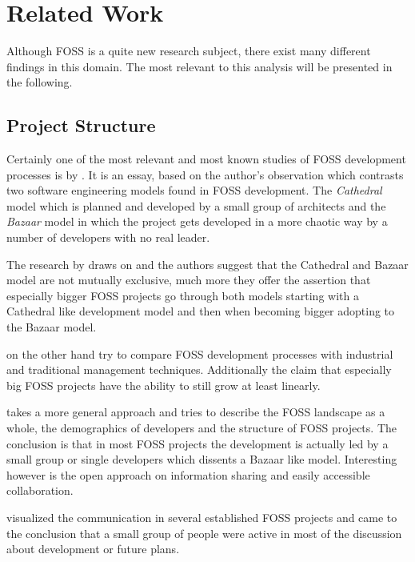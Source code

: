 \chapter{Related Work} %
\label{chap:related work}

Although \ac{FOSS} is a quite new research subject, there exist many different
findings in this domain. The most relevant to this analysis will be presented
in the following.

\section{Project Structure} %

Certainly one of the most relevant and most known studies of \ac{FOSS}
development processes is  by \textcite{Raymond1998}. It
is an essay, based on the author's observation which contrasts two software
engineering models found in \ac{FOSS} development. The \emph{Cathedral} model
which is planned and developed by a small group of architects and the
\emph{Bazaar} model in which the project gets developed in a more chaotic way
by a number of developers with no real leader.

The research by \textcite{Capiluppi2007} draws on  and
the authors suggest that the Cathedral and Bazaar model are not mutually
exclusive, much more they offer the assertion that especially bigger \ac{FOSS}
projects go through both models starting with a Cathedral like development
model and then when becoming bigger adopting to the Bazaar model.

\textcite{Godfrey2000} on the other hand try to compare \ac{FOSS} development
processes with industrial and traditional management techniques. Additionally
the claim that especially big \ac{FOSS} projects have the ability to still grow
at least linearly.

\textcite{Kim2003} takes a more general approach and tries to describe the
\ac{FOSS} landscape as a whole, the demographics of developers and the
structure of \ac{FOSS} projects. The conclusion is that in most \ac{FOSS}
projects the development is actually led by a small group or single developers
which dissents a Bazaar like model. Interesting however is the open approach on
information sharing and easily accessible collaboration.

\textcite{Ogawa2007} visualized the communication in several established
\ac{FOSS} projects and came to the conclusion that a small group of people were
active in most of the discussion about development or future plans.

